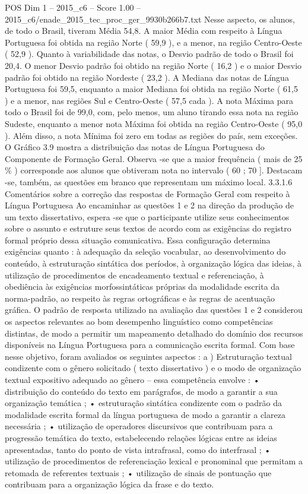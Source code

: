 \begin{textsample}{POS Dim 1 – 2015\_c6 – Score 1.00 – 2015\_c6/enade\_2015\_tec\_proc\_ger\_9930b266b7.txt}
Nesse aspecto, os alunos, de todo o Brasil, tiveram Média 54,8.
A maior Média com respeito à Língua Portuguesa foi obtida na região Norte ( 59,9 ), e a menor, na região Centro-Oeste ( 52,9 ).
Quanto à variabilidade das notas, o Desvio padrão de todo o Brasil foi 20,4.
O menor Desvio padrão foi obtido na região Norte ( 16,2 ) e o maior Desvio padrão foi obtido na região Nordeste ( 23,2 ).
A Mediana das notas de Língua Portuguesa foi 59,5, enquanto a maior Mediana foi obtida na região Norte ( 61,5 ) e a menor, nas regiões Sul e Centro-Oeste ( 57,5 cada ).
A nota Máxima para todo o Brasil foi de 99,0, com, pelo menos, um aluno tirando essa nota na região Sudeste, enquanto a menor nota Máxima foi obtida na região Centro-Oeste ( 95,0 ).
Além disso, a nota Mínima foi zero em todas as regiões do país, sem exceções.
O Gráfico 3.9 mostra a distribuição das notas de Língua Portuguesa do Componente de Formação Geral.
Observa -se que a maior frequência ( mais de 25 \% ) corresponde aos alunos que obtiveram nota no intervalo ( 60 ; 70 ].
Destacam -se, também, as questões em branco que representam um máximo local. 3.3.1.6 Comentários sobre a correção das respostas de Formação Geral com respeito à Língua Portuguesa Ao encaminhar as questões 1 e 2 na direção da produção de um texto dissertativo, espera -se que o participante utilize seus conhecimentos sobre o assunto e estruture seus textos de acordo com as exigências do registro formal próprio dessa situação comunicativa.
Essa configuração determina exigências quanto : à adequação da seleção vocabular, ao desenvolvimento do conteúdo, à estruturação sintática dos períodos, à organização lógica das ideias, à utilização de procedimentos de encadeamento textual e referenciação, à obediência às exigências morfossintáticas próprias da modalidade escrita da norma-padrão, ao respeito às regras ortográficas e às regras de acentuação gráfica.
O padrão de resposta utilizado na avaliação das questões 1 e 2 considerou os aspectos relevantes ao bom desempenho linguístico como competências distintas, de modo a permitir um mapeamento detalhado do domínio dos recursos disponíveis na Língua Portuguesa para a comunicação escrita formal.
Com base nesse objetivo, foram avaliados os seguintes aspectos : a ) Estruturação textual condizente com o gênero solicitado ( texto dissertativo ) e o modo de organização textual expositivo adequado ao gênero – essa competência envolve : • distribuição do conteúdo do texto em parágrafos, de modo a garantir a sua organização temática ; • estruturação sintática condizente com o padrão da modalidade escrita formal da língua portuguesa de modo a garantir a clareza necessária ; • utilização de operadores discursivos que contribuam para a progressão temática do texto, estabelecendo relações lógicas entre as ideias apresentadas, tanto do ponto de vista intrafrasal, como do interfrasal ; • utilização de procedimentos de referenciação lexical e pronominal que permitam a retomada de referentes textuais ; • utilização de sinais de pontuação que contribuam para a organização lógica da frase e do texto.

\end{textsample}
